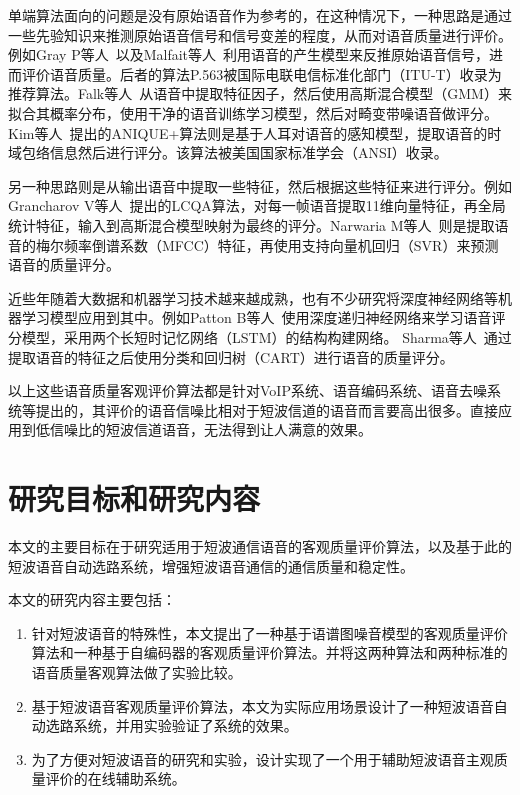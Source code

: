 单端算法面向的问题是没有原始语音作为参考的，在这种情况下，一种思路是通过一些先验知识来推测原始语音信号和信号变差的程度，从而对语音质量进行评价。例如Gray P等人~\cite{gray2000non}以及Malfait等人~\cite{malfait2006p}利用语音的产生模型来反推原始语音信号，进而评价语音质量。后者的算法P.563被国际电联电信标准化部门（ITU-T）收录为推荐算法。Falk等人~\cite{falk2006nonintrusive}从语音中提取特征因子，然后使用高斯混合模型（GMM）来拟合其概率分布，使用干净的语音训练学习模型，然后对畸变带噪语音做评分。Kim等人~\cite{kim2007anique+}提出的ANIQUE+算法则是基于人耳对语音的感知模型，提取语音的时域包络信息然后进行评分。该算法被美国国家标准学会（ANSI）收录。

另一种思路则是从输出语音中提取一些特征，然后根据这些特征来进行评分。例如Grancharov V等人~\cite{grancharov2006low}提出的LCQA算法，对每一帧语音提取11维向量特征，再全局统计特征，输入到高斯混合模型映射为最终的评分。Narwaria M等人~\cite{narwaria2010non}则是提取语音的梅尔频率倒谱系数（MFCC）特征，再使用支持向量机回归（SVR）来预测语音的质量评分。

近些年随着大数据和机器学习技术越来越成熟，也有不少研究将深度神经网络等机器学习模型应用到其中。例如Patton B等人~\cite{patton2016automos}使用深度递归神经网络来学习语音评分模型，采用两个长短时记忆网络（LSTM）的结构构建网络。 Sharma等人~\cite{sharma2016data}通过提取语音的特征之后使用分类和回归树（CART）进行语音的质量评分。

以上这些语音质量客观评价算法都是针对VoIP系统、语音编码系统、语音去噪系统等提出的，其评价的语音信噪比相对于短波信道的语音而言要高出很多。直接应用到低信噪比的短波信道语音，无法得到让人满意的效果。


\section{研究目标和研究内容}

本文的主要目标在于研究适用于短波通信语音的客观质量评价算法，以及基于此的短波语音自动选路系统，增强短波语音通信的通信质量和稳定性。

本文的研究内容主要包括：
\begin{enumerate}
\item 针对短波语音的特殊性，本文提出了一种基于语谱图噪音模型的客观质量评价算法和一种基于自编码器的客观质量评价算法。并将这两种算法和两种标准的语音质量客观算法做了实验比较。
\item 基于短波语音客观质量评价算法，本文为实际应用场景设计了一种短波语音自动选路系统，并用实验验证了系统的效果。
\item 为了方便对短波语音的研究和实验，设计实现了一个用于辅助短波语音主观质量评价的在线辅助系统。
\end{enumerate}

